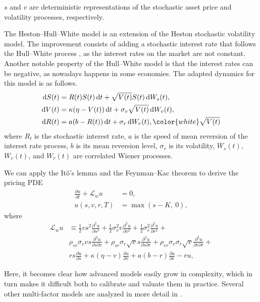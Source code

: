 \documentclass{UUThesisTemplate}
\begin{document}
$s$ and $v$ are deterministic representations of the stochastic asset price and volatility processes, respectively.
\par The Heston--Hull--White model is an extension of the Heston stochastic volatility model. The improvement consists of adding a stochastic interest rate that follows the Hull--White process \cite{hull1990pricing}, as the interest rates on the market are not constant. Another notable property of the Hull--White model is that the interest rates can be negative, as nowadays happens in some economies. The adapted dynamics for this model is as follows.
\begin{align}
\dif S(t) & =  R(t)S(t)\dif t + \sqrt{V(t)}S(t)\dif W_s(t), \label{hhwSDE1} \\
\dif V(t) & =  \kappa(\eta-V(t))\dif t + \sigma_v \sqrt{V(t)}\dif W_v(t), \label{hhwSDE2} \\
\dif R(t) & = a(b-R(t))\dif t + \sigma_r\dif W_r(t), {\color{white} \sqrt{V(t)}} \label{hhwSDE3}
\end{align}
where $R_t$ is the stochastic interest rate, $a$ is the speed of mean reversion of the interest rate process, $b$ is its mean reversion level, $\sigma_r$ is its volatility,  $W_s(t)$, $W_v(t)$,  and $W_r(t)$ are correlated Wiener processes.
\par We can apply the It\^{o}'s lemma and the Feynman--Kac theorem to derive the pricing PDE
\begin{align}
\frac{\partial u}{\partial t}+\mathcal{L}_w u&=0, \nonumber \\
u(s,v,r,T) &= \max(s-K,\ 0), \label{hhwPDE}
\end{align}
where
\begin{align}
\mathcal{L}_{w} u &\equiv  \frac{1}{2}vs^2\frac{\partial^2 u}{\partial s^2} + \frac{1}{2}\sigma_v^2v\frac{\partial^2 u}{\partial v^2}  + \frac{1}{2}\sigma_r^2\frac{\partial^2 u}{\partial r^2} + \nonumber \\
                             & \rho_{sv}\sigma_v vs\frac{\partial^2 u}{\partial s\partial v} + \rho_{sr}\sigma_r \sqrt{v} s\frac{\partial^2 u}{\partial s\partial r} + \rho_{vr}\sigma_v\sigma_r \sqrt{v}\frac{\partial^2 u}{\partial v\partial r} + \nonumber \\
                             & rs\frac{\partial u}{\partial s} + \kappa(\eta-v)\frac{\partial u}{\partial v} + a(b-r)\frac{\partial u}{\partial r} - ru, \label{eqHHWop}
\end{align}
\par Here, it becomes clear how advanced models easily grow in complexity, which in turn makes it difficult both to calibrate and valuate them in practice. Several other multi-factor models are analyzed in more detail in \cite{paper3, paper5}. 
%
\end{document}
